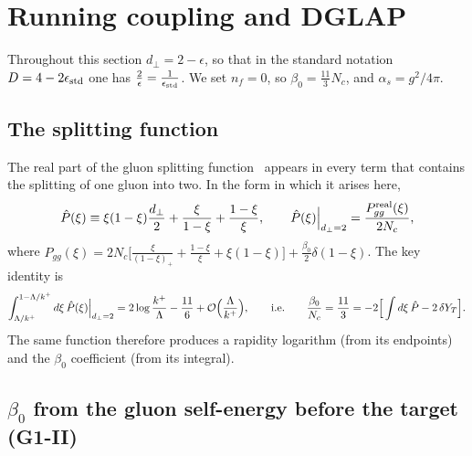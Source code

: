 \section{Running coupling and DGLAP}\label{sec:rc}

Throughout this section $d_\perp=2-\epsilon$, so that in the standard notation $D=4-2\epsilon_{\rm std}$ one has $\frac2\epsilon=\frac{1}{\epsilon_{\rm std}}$. We set $n_f=0$, so $\beta_0=\frac{11}{3}N_c$, and $\alpha_s=g^2/4\pi$.

\subsection{The splitting function}\label{sec:Phat}

The real part of the gluon splitting function~\cite{Gribov:1972ri,Altarelli:1977zs,Dokshitzer:1977sg} appears in every term that contains the splitting of one gluon into two. In the form in which it arises here,
\begin{equation}
\hat P(\xi)\equiv\xi(1-\xi)\frac{d_\perp}{2}+\frac{\xi}{1-\xi}+\frac{1-\xi}{\xi},\qquad \hat P(\xi)\Big|_{d_\perp=2}=\frac{P^{\rm real}_{gg}(\xi)}{2N_c},
\label{eq:Phat}
\end{equation}
where $P_{gg}(\xi)=2N_c\big[\frac{\xi}{(1-\xi)_+}+\frac{1-\xi}{\xi}+\xi(1-\xi)\big]+\frac{\beta_0}{2}\delta(1-\xi)$. The key identity is
\begin{equation}
\int_{\Lambda/k^+}^{1-\Lambda/k^+}d\xi\,\hat P(\xi)\Big|_{d_\perp=2}=2\log\frac{k^+}{\Lambda}-\frac{11}{6}+\mathcal{O}\Big(\frac{\Lambda}{k^+}\Big),\qquad\text{i.e.}\qquad \frac{\beta_0}{N_c}=\frac{11}{3}=-2\Big[\int d\xi\,\hat P-2\,\delta Y_T\Big].
\label{eq:intPhat}
\end{equation}
The same function therefore produces a rapidity logarithm (from its endpoints) and the $\beta_0$ coefficient (from its integral).

\subsection{\texorpdfstring{$\beta_0$}{beta0} from the gluon self-energy before the target (G1-II)}\label{sec:b0II}

